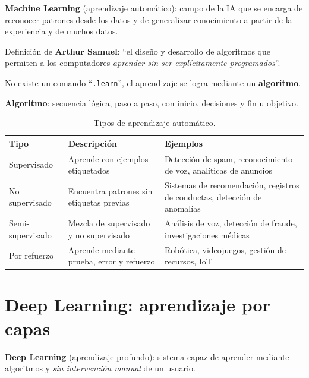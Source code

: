 \begin{definicion}
\textbf{Machine Learning} (aprendizaje automático): campo de la IA que se encarga de reconocer patrones desde los datos y de generalizar conocimiento a partir de la experiencia y de muchos datos.

Definición de \textbf{Arthur Samuel}: ``el diseño y desarrollo de algoritmos que permiten a los computadores \emph{aprender sin ser explícitamente programados}''.
\end{definicion}

No existe un comando ``\texttt{.learn}'', el aprendizaje se logra mediante un \textbf{algoritmo}.

\begin{definicion}
\textbf{Algoritmo}: secuencia lógica, paso a paso, con inicio, decisiones y fin u objetivo.
\end{definicion}

\begin{table}[H]
\centering
\caption{Tipos de aprendizaje automático.}
\label{tab:tipos-ml}
\small
\begin{tabularx}{\textwidth}{@{}lXX@{}}
\toprule
\textbf{Tipo} & \textbf{Descripción} & \textbf{Ejemplos} \\
\midrule
Supervisado & Aprende con ejemplos etiquetados & Detección de spam, reconocimiento de voz, analíticas de anuncios \\
No supervisado & Encuentra patrones sin etiquetas previas & Sistemas de recomendación, registros de conductas, detección de anomalías \\
Semi-supervisado & Mezcla de supervisado y no supervisado & Análisis de voz, detección de fraude, investigaciones médicas \\
Por refuerzo & Aprende mediante prueba, error y refuerzo & Robótica, videojuegos, gestión de recursos, IoT \\
\bottomrule
\end{tabularx}
\end{table}

\section{Deep Learning: aprendizaje por capas}

\begin{definicion}
\textbf{Deep Learning} (aprendizaje profundo): sistema capaz de aprender mediante algoritmos y \emph{sin intervención manual} de un usuario.
\end{definicion}

